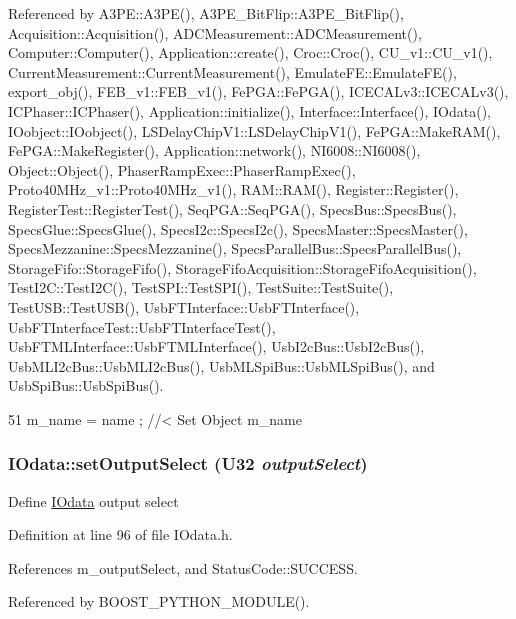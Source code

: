 Referenced by A3PE::A3PE(), A3PE\_\-BitFlip::A3PE\_\-BitFlip(), Acquisition::Acquisition(), ADCMeasurement::ADCMeasurement(), Computer::Computer(), Application::create(), Croc::Croc(), CU\_\-v1::CU\_\-v1(), CurrentMeasurement::CurrentMeasurement(), EmulateFE::EmulateFE(), export\_\-obj(), FEB\_\-v1::FEB\_\-v1(), FePGA::FePGA(), ICECALv3::ICECALv3(), ICPhaser::ICPhaser(), Application::initialize(), Interface::Interface(), IOdata(), IOobject::IOobject(), LSDelayChipV1::LSDelayChipV1(), FePGA::MakeRAM(), FePGA::MakeRegister(), Application::network(), NI6008::NI6008(), Object::Object(), PhaserRampExec::PhaserRampExec(), Proto40MHz\_\-v1::Proto40MHz\_\-v1(), RAM::RAM(), Register::Register(), RegisterTest::RegisterTest(), SeqPGA::SeqPGA(), SpecsBus::SpecsBus(), SpecsGlue::SpecsGlue(), SpecsI2c::SpecsI2c(), SpecsMaster::SpecsMaster(), SpecsMezzanine::SpecsMezzanine(), SpecsParallelBus::SpecsParallelBus(), StorageFifo::StorageFifo(), StorageFifoAcquisition::StorageFifoAcquisition(), TestI2C::TestI2C(), TestSPI::TestSPI(), TestSuite::TestSuite(), TestUSB::TestUSB(), UsbFTInterface::UsbFTInterface(), UsbFTInterfaceTest::UsbFTInterfaceTest(), UsbFTMLInterface::UsbFTMLInterface(), UsbI2cBus::UsbI2cBus(), UsbMLI2cBus::UsbMLI2cBus(), UsbMLSpiBus::UsbMLSpiBus(), and UsbSpiBus::UsbSpiBus().


\begin{DoxyCode}
51 { m_name  = name  ; } //< Set Object m_name
\end{DoxyCode}
\hypertarget{classIOdata_a09675d3efa14ba00cc22f8ff8d463389}{
\subsubsection[{setOutputSelect}]{ IOdata::setOutputSelect ({\bf U32} {\em outputSelect})}}
\label{classIOdata_a09675d3efa14ba00cc22f8ff8d463389}
Define \hyperlink{classIOdata}{IOdata} output select 

Definition at line 96 of file IOdata.h.

References m\_\-outputSelect, and StatusCode::SUCCESS.

Referenced by BOOST\_\-PYTHON\_\-MODULE().


